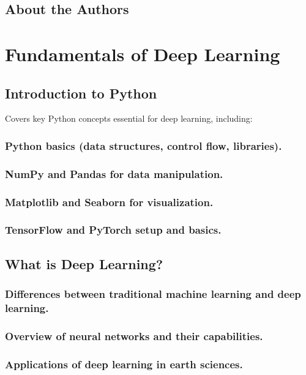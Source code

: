 





\chapter*{About the Authors}

\part{Fundamentals of Deep Learning}

\chapter{Introduction to Python}
Covers key Python concepts essential for deep learning, including:
\section{Python basics (data structures, control flow, libraries).}
\section{NumPy and Pandas for data manipulation.}
\section{Matplotlib and Seaborn for visualization.}
\section{TensorFlow and PyTorch setup and basics.}

\chapter{What is Deep Learning?}
\section{Differences between traditional machine learning and deep learning.}
\section{Overview of neural networks and their capabilities.}
\section{Applications of deep learning in earth sciences.}

